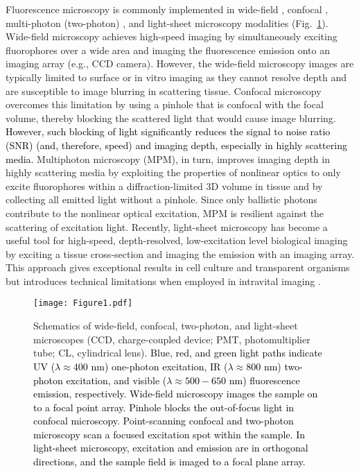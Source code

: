 \documentclass[12pt]{iopart}
\newcommand{\cc}[1]{\textcolor{black}{#1}}
\begin{document}
Fluorescence microscopy is commonly implemented in wide-field \cite{wide-field}, confocal \cite{Confocal_Handbook, ConfocalMicroscopy}, multi-photon (two-photon) \cite{MPM, NonlinearMagic}, and light-sheet microscopy modalities \cite{lightsheet} (Fig.~\ref{fig:modalities}). Wide-field microscopy achieves high-speed imaging by simultaneously exciting fluorophores over a wide area and imaging the fluorescence emission onto an imaging array (e.g., CCD camera). However, the wide-field microscopy images are typically limited to surface or in vitro imaging as they cannot resolve depth and are susceptible to image blurring in scattering tissue. Confocal microscopy overcomes this limitation by using a pinhole that is confocal with the focal volume, thereby blocking the scattered light that would cause image blurring. \cc{However, such blocking of light significantly reduces the signal to noise ratio (SNR) (and, therefore, speed) and imaging depth, especially in highly scattering media.} Multiphoton microscopy (MPM), in turn, improves imaging depth in highly scattering media by exploiting the properties of nonlinear optics to only excite fluorophores within a diffraction-limited 3D volume in tissue and by collecting all emitted light without a pinhole. Since only ballistic photons contribute to the nonlinear optical excitation, MPM is resilient against the scattering of excitation light. Recently, light-sheet microscopy has become a useful tool for high-speed, depth-resolved, low-excitation level biological imaging by exciting a tissue cross-section and imaging the emission with an imaging array. This approach gives exceptional results in cell culture and transparent organisms but introduces technical limitations when employed in intravital imaging \cite{scape,andrew}. 

\begin{figure}[!t]
	\centering
	\texttt{[image: Figure1.pdf]}
	\caption{Schematics of wide-field, confocal, two-photon, and light-sheet microscopes (CCD, charge-coupled device; PMT, photomultiplier tube; CL, cylindrical lens). \cc{Blue, red, and green light paths indicate UV ($\lambda\approx 400$ nm) one-photon excitation, IR ($\lambda\approx 800$ nm) two-photon excitation, and visible ($\lambda\approx 500-650 $ nm) fluorescence emission, respectively. Wide-field microscopy images the sample on to a focal point array. Pinhole blocks the out-of-focus light in confocal microscopy. Point-scanning confocal and two-photon microscopy scan a focused excitation spot within the sample. In light-sheet microscopy, excitation and emission are in orthogonal directions, and the sample field is imaged to a focal plane array.}}
	\label{fig:modalities}
\end{figure}
\end{document}
